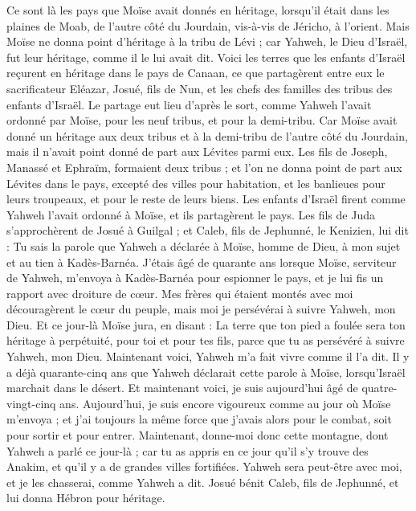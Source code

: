 \begin{multicols}{2}
Ce sont là les pays que Moïse avait donnés en héritage, lorsqu’il était dans les plaines de Moab, de l’autre côté du Jourdain, vis-à-vis de Jéricho, à l’orient.
Mais Moïse ne donna point d’héritage à la tribu de Lévi ; car Yahweh, le Dieu d’Israël, fut leur héritage, comme il le lui avait dit.
\VerseOne{}Voici les terres que les enfants d’Israël reçurent en héritage dans le pays de Canaan, ce que partagèrent entre eux le sacrificateur Eléazar, Josué, fils de Nun, et les chefs des familles des tribus des enfants d’Israël.
Le partage eut lieu d’après le sort, comme Yahweh l’avait ordonné par Moïse, pour les neuf tribus, et pour la demi-tribu.
Car Moïse avait donné un héritage aux deux tribus et à la demi-tribu de l’autre côté du Jourdain, mais il n’avait point donné de part aux Lévites parmi eux.
Les fils de Joseph, Manassé et Ephraïm, formaient deux tribus ; et l’on ne donna point de part aux Lévites dans le pays, excepté des villes pour habitation, et les banlieues pour leurs troupeaux, et pour le reste de leurs biens.
Les enfants d’Israël firent comme Yahweh l’avait ordonné à Moïse, et ils partagèrent le pays.
Les fils de Juda s’approchèrent de Josué à Guilgal ; et Caleb, fils de Jephunné, le Kenizien, lui dit : Tu sais la parole que Yahweh a déclarée à Moïse, homme de Dieu, à mon sujet et au tien à Kadès-Barnéa.
J’étais âgé de quarante ans lorsque Moïse, serviteur de Yahweh, m’envoya à Kadès-Barnéa pour espionner le pays, et je lui fis un rapport avec droiture de cœur.
Mes frères qui étaient montés avec moi découragèrent le cœur du peuple, mais moi je persévérai à suivre Yahweh, mon Dieu.
Et ce jour-là Moïse jura, en disant : La terre que ton pied a foulée sera ton héritage à perpétuité, pour toi et pour tes fils, parce que tu as persévéré à suivre Yahweh, mon Dieu.
Maintenant voici, Yahweh m’a fait vivre comme il l’a dit. Il y a déjà quarante-cinq ans que Yahweh déclarait cette parole à Moïse, lorsqu’Israël marchait dans le désert. Et maintenant voici, je suis aujourd’hui âgé de quatre-vingt-cinq ans.
Aujourd’hui, je suis encore vigoureux comme au jour où Moïse m’envoya ; et j’ai toujours la même force que j’avais alors pour le combat, soit pour sortir et pour entrer.
Maintenant, donne-moi donc cette montagne, dont Yahweh a parlé ce jour-là ; car tu as appris en ce jour qu’il s’y trouve des Anakim, et qu’il y a de grandes villes fortifiées. Yahweh sera peut-être avec moi, et je les chasserai, comme Yahweh a dit.
Josué bénit Caleb, fils de Jephunné, et lui donna Hébron pour héritage.

\end{multicols}
